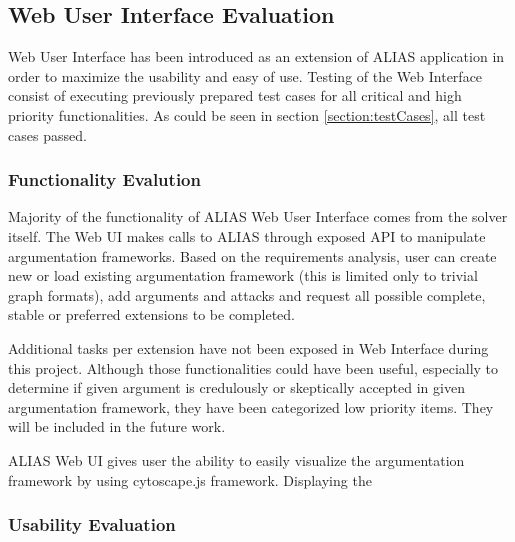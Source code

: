 \subsection{Web User Interface Evaluation}
Web User Interface has been introduced as an extension of ALIAS application in order to maximize the usability and easy of use. Testing of the Web Interface consist of executing previously prepared test cases for all critical and high priority functionalities. As could be seen in section \ref{section:testCases}, all test cases passed.

\subsubsection{Functionality Evalution}
Majority of the functionality of ALIAS Web User Interface comes from the solver itself. The Web UI makes calls to ALIAS through exposed API to manipulate argumentation frameworks. Based on the requirements analysis, user can create new or load existing argumentation framework (this is limited only to trivial graph formats), add arguments and attacks and request all possible complete, stable or preferred extensions to be completed. 

Additional tasks per extension have not been exposed in Web Interface during this project. Although those functionalities could have been useful, especially to determine if given argument is credulously or skeptically accepted in given argumentation framework, they have been categorized low priority items. They will be included in the future work.

ALIAS Web UI gives user the ability to easily visualize the argumentation framework by using cytoscape.js framework. Displaying the 

\subsubsection{Usability Evaluation}
